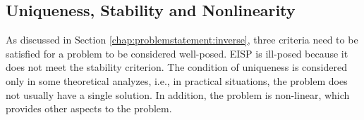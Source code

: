 		
		\subsection{Uniqueness, Stability and Nonlinearity}\label{chap:problemstatement:eisp:4}
			
			As discussed in Section \ref{chap:problemstatement:inverse}, three criteria need to be satisfied for a problem to be considered well-posed. EISP is ill-posed because it does not meet the stability criterion. The condition of uniqueness is considered only in some theoretical analyzes, i.e., in practical situations, the problem does not usually have a single solution. In addition, the problem is non-linear, which provides other aspects to the problem.
			
